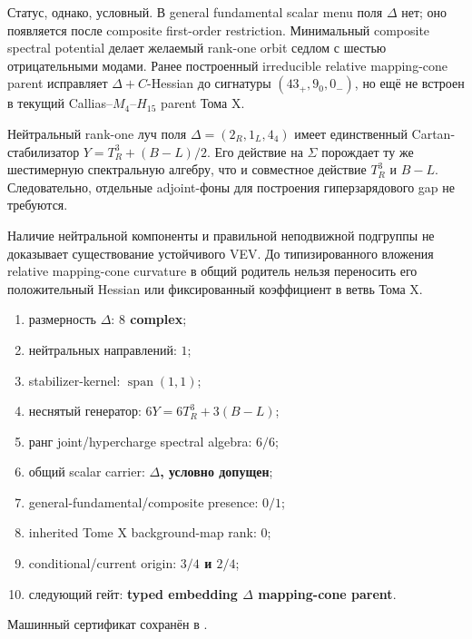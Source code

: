 Статус, однако, условный. В general fundamental scalar menu поля $\Delta$
нет; оно появляется после composite first-order restriction. Минимальный
composite spectral potential делает желаемый rank-one orbit седлом с шестью
отрицательными модами. Ранее построенный irreducible relative mapping-cone
parent исправляет $\Delta+C$-Hessian до сигнатуры $(43_+,9_0,0_-)$, но ещё
не встроен в текущий Callias--$M_4$--$H_{15}$ parent Тома X.

\begin{theorem}
Нейтральный rank-one луч поля
$\Delta=(2_R,1_L,4_4)$ имеет единственный Cartan-стабилизатор
$Y=T_R^3+(B-L)/2$. Его действие на $\Sigma$ порождает ту же шестимерную
спектральную алгебру, что и совместное действие $T_R^3$ и $B-L$.
Следовательно, отдельные adjoint-фоны для построения гиперзарядового gap не
требуются.
\end{theorem}

\begin{nogocriterion}
Наличие нейтральной компоненты и правильной неподвижной подгруппы не
доказывает существование устойчивого VEV. До типизированного вложения
relative mapping-cone curvature в общий родитель нельзя переносить его
положительный Hessian или фиксированный коэффициент в ветвь Тома X.
\end{nogocriterion}

\begin{protocol}\begin{enumerate}
\item размерность $\Delta$: \textbf{$8$ complex};
\item нейтральных направлений: \textbf{$1$};
\item stabilizer-kernel: \textbf{$\operatorname{span}(1,1)$};
\item неснятый генератор: \textbf{$6Y=6T_R^3+3(B-L)$};
\item ранг joint/hypercharge spectral algebra: \textbf{$6/6$};
\item общий scalar carrier: \textbf{$\Delta$, условно допущен};
\item general-fundamental/composite presence: \textbf{$0/1$};
\item inherited Tome X background-map rank: \textbf{$0$};
\item conditional/current origin: \textbf{$3/4$ и $2/4$};
\item следующий гейт: \textbf{typed embedding $\Delta$ mapping-cone parent}.
\end{enumerate}\end{protocol}

Машинный сертификат сохранён в
.